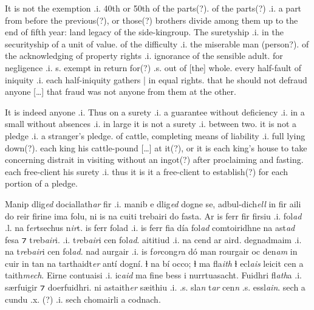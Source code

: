 \documentclass[11pt]{article}
\begin{document}
\begin{pages}
\begin{Rightside}
    \pstart
    It is not the exemption .i. 40th or 50th of the parts(?). of the parts(?) .i. a part from before the previous(?), or those(?) brothers divide among them up to the end of fifth year: land legacy of the side-kingroup. The suretyship .i. in the securityship of a unit of value.  of the difficulty .i. the miserable man (person?). of the acknowledging of property rights .i. ignorance of the sensible adult. for negligence .i. s. exempt in return for(?) .s. out of [the] whole. every half-fault of iniquity .i. each half-iniquity gathers | in equal rights. that he should not defraud anyone [\ldots] that fraud was not anyone from them at the other. 
    \pend
  
    \pstart
    It is indeed anyone .i. Thus on a surety .i. a guarantee without deficiency .i. in a small without absences .i. in large it is not a surety .i. between two.  it is not a pledge .i. a stranger's pledge.  of cattle, completing means of liability .i. full lying down(?).  each king his cattle-pound [\ldots] at it(?), or it is each king's house to take concerning distrait in visiting without an ingot(?) after proclaiming and fasting.  each free-client his surety .i. thus it is it a free-client to establish(?) for each portion of a pledge.

    \pend
  \endnumbering
  \end{Rightside}
  \Pages
 
  \begin{Leftside}
    \beginnumbering
   \pstart 
    Manip dlig\emph{ed} dociallath\emph{ar}  fir .i. manib e dlig\emph{ed} dogne se, adbul-dich\emph{ell} in fir aili do reir firine ima folu, ni is  na cuiti trebairi do fasta.  Ar is ferr fir firsiu .i. fol\emph{ad} .l. na f\emph{er}tsechus n\emph{ir}t.  is ferr folad .i. is ferr fia d\'{i}a fol\emph{ad} comtoiridhne na ast\emph{ad} fesa ⁊ t\emph{r}eb\emph{air}i.   .i. t\emph{r}eb\emph{air}i cen fol\emph{ad}.  aititiud .i. na cend ar aird.  degnadmaim .i. na t\emph{re}b\emph{air}i cen fol\emph{ad}.   nad aurgair .i. is f\emph{or}cong\emph{r}a d\'{o} man rourgair oc den\emph{am} in cuir in tan na tarthaidt\emph{er} ant\'{i} dogn\'{i}.  ɫ na b\'{i} occo; ɫ ma fla\emph{ith} ɫ ecl\emph{ais} leicit cen a taith\emph{mech}.  Eirne contuaisi .i. ic\emph{aid} ma fine bess i nurrtuasacht.  Fuidhri fl\emph{ath}a .i. særfuigir ⁊ doerfuidhri.  ni astaith\emph{er} sæithiu .i. .s. sla\emph{n} t\emph{ar} cen\emph{n} .s. essl\emph{ain}.  sech a cundu .x. (?) .i. sech chomairli a codnach. 
    \pend
  

\end{Leftside}
\end{pages}
\end{document}
